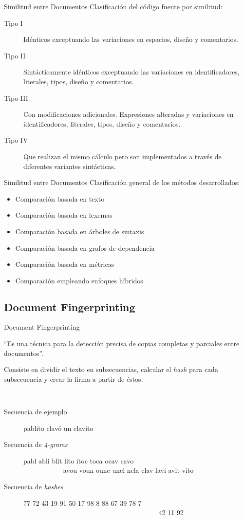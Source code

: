 \documentclass{beamer}
\begin{document}
\begin{frame}{Similitud entre Documentos}
Clasificación del código fuente por similitud:
\begin{description}
  \item [Tipo I] Idénticos exceptuando las variaciones en espacios, diseño y comentarios.
  \item [Tipo II] Sintácticamente idénticos exceptuando las variaciones en identificadores, literales, tipos, diseño y comentarios.
  \item [Tipo III] Con modificaciones adicionales. Expresiones alteradas y variaciones en identificadores, literales, tipos, diseño y comentarios.
  \item [Tipo IV] Que realizan el mismo cálculo pero son implementados a través de diferentes variantes sintácticas.
\end{description}
\end{frame}

\begin{frame}{Similitud entre Documentos}
Clasificación general de los métodos desarrollados:
\begin{itemize}
  \item Comparación basada en texto
  \item Comparación basada en lexemas
  \item Comparación basada en árboles de sintaxis
  \item Comparación basada en grafos de dependencia
  \item Comparación basada en métricas
  \item Comparación empleando enfoques híbridos
\end{itemize}
\end{frame}

\subsection{Document Fingerprinting}
\begin{frame}{Document Fingerprinting}
\begin{center}
``Es una técnica para la detección precisa de copias completas y parciales entre documentos''.
\end{center}

Consiste en dividir el texto en subsecuencias, calcular el \textit{hash} para cada 
subsecuencia y crear la firma a partir de éstos.

~
\begin{description}
  \item [Secuencia de ejemplo] pablito clavó un clavito
  \item [Secuencia de \textit{4-grams}] pabl abli blit lito itoc toca ocav cavo \\~~~~~~~~~~~ avou voun ounc uncl ncla clav lavi avit vito
  \item [Secuencia de \textit{hashes}] 77 72 43 19 91 50 17 98 8 88 67 39 78 7 \\~~~~~~~~~~~~~~~~~~~~~~~~~~~~~~~~~~~~~~~ 42 11 92
\end{description}
\end{frame}
\end{document}
